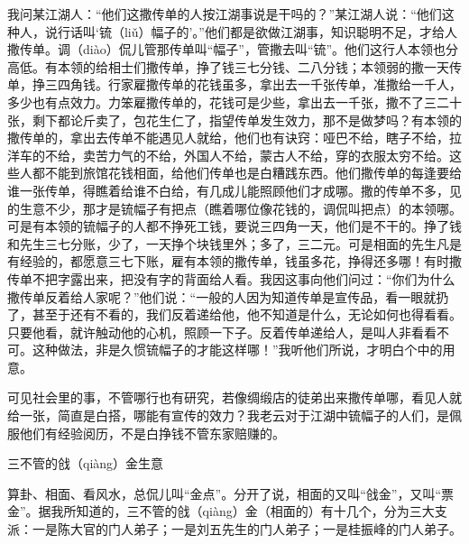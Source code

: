 \documentclass[12pt,UTF8]{ctexbook}
\begin{document}
我问某江湖人：“他们这撒传单的人按江湖事说是干吗的？”某江湖人说：“他们这种人，说行话叫‘锍（liǔ）幅子的’。”他们都是欲做江湖事，知识聪明不足，才给人撒传单。调（diào）侃儿管那传单叫“幅子”，管撒去叫“锍”。他们这行人本领也分高低。有本领的给相士们撒传单，挣了钱三七分钱、二八分钱；本领弱的撒一天传单，挣三四角钱。行家雇撒传单的花钱虽多，拿出去一千张传单，准撒给一千人，多少也有点效力。力笨雇撒传单的，花钱可是少些，拿出去一千张，撒不了三二十张，剩下都论斤卖了，包花生仁了，指望传单发生效力，那不是做梦吗？有本领的撒传单的，拿出去传单不能遇见人就给，他们也有诀窍：哑巴不给，瞎子不给，拉洋车的不给，卖苦力气的不给，外国人不给，蒙古人不给，穿的衣服太穷不给。这些人都不能到旅馆花钱相面，给他们传单也是白糟践东西。他们撒传单的每逢要给谁一张传单，得瞧着给谁不白给，有几成儿能照顾他们才成哪。撒的传单不多，见的生意不少，那才是锍幅子有把点（瞧着哪位像花钱的，调侃叫把点）的本领哪。可是有本领的锍幅子的人都不挣死工钱，要说三四角一天，他们是不干的。挣了钱和先生三七分账，少了，一天挣个块钱里外；多了，三二元。可是相面的先生凡是有经验的，都愿意三七下账，雇有本领的撒传单，钱虽多花，挣得还多哪！有时撒传单不把字露出来，把没有字的背面给人看。我因这事向他们问过：“你们为什么撒传单反着给人家呢？”他们说：“一般的人因为知道传单是宣传品，看一眼就扔了，甚至于还有不看的，我们反着递给他，他不知道是什么，无论如何也得看看。只要他看，就许触动他的心机，照顾一下子。反着传单递给人，是叫人非看看不可。这种做法，非是久惯锍幅子的才能这样哪！”我听他们所说，才明白个中的用意。

可见社会里的事，不管哪行也有研究，若像绸缎店的徒弟出来撒传单哪，看见人就给一张，简直是白搭，哪能有宣传的效力？我老云对于江湖中锍幅子的人们，是佩服他们有经验阅历，不是白挣钱不管东家赔赚的。





三不管的戗（qiàng）金生意


算卦、相面、看风水，总侃儿叫“金点”。分开了说，相面的又叫“戗金”，又叫“票金”。据我所知道的，三不管的戗（qiàng）金（相面的）有十几个，分为三大支派：一是陈大官的门人弟子；一是刘五先生的门人弟子；一是桂振峰的门人弟子。
\end{document}
